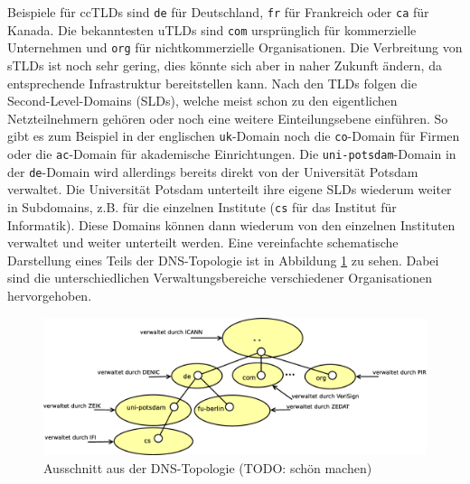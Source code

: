 \documentclass[a4paper, 12pt, BCOR10mm, DIV12, toc=bibliography, toc=listof, german]{scrbook}
\begin{document}
				Beispiele für ccTLDs sind \texttt{de} für Deutschland, \texttt{fr} für Frankreich oder
				\texttt{ca} für Kanada. Die bekanntesten uTLDs sind \texttt{com} ursprünglich für
				kommerzielle Unternehmen und \texttt{org} für nichtkommerzielle Organisationen. Die
				Verbreitung von sTLDs ist noch sehr gering, dies könnte sich aber in naher Zukunft ändern,
				da entsprechende Infrastruktur bereitstellen kann. Nach den TLDs folgen die
				Second-Level-Domains (SLDs), welche meist schon zu den eigentlichen Netzteilnehmern gehören
				oder noch eine weitere Einteilungsebene einführen. So gibt es zum Beispiel in der englischen
				\texttt{uk}-Domain noch die \texttt{co}-Domain für Firmen oder die \texttt{ac}-Domain für
				akademische Einrichtungen. Die \texttt{uni-potsdam}-Domain in der \texttt{de}-Domain wird
				allerdings bereits direkt von der Universität Potsdam verwaltet. Die Universität Potsdam
				unterteilt ihre eigene SLDs wiederum weiter in Subdomains, z.B. für die einzelnen Institute
				(\texttt{cs} für das Institut für Informatik). Diese Domains können dann wiederum von den
				einzelnen Instituten verwaltet und weiter unterteilt werden. Eine vereinfachte schematische
				Darstellung eines Teils der DNS-Topologie ist in Abbildung \ref{fig:dns-tree} zu sehen.
				Dabei sind die unterschiedlichen Verwaltungsbereiche verschiedener Organisationen
				hervorgehoben.

				\begin{figure}
					\centering
					\includegraphics[width=\textwidth]{images/dns-tree}
					\caption{Ausschnitt aus der DNS-Topologie (TODO: schön machen)}
					\label{fig:dns-tree}
				\end{figure}
\end{document}
